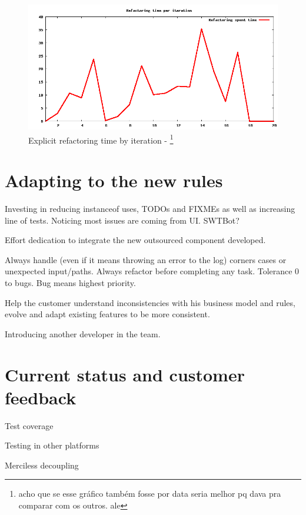 \documentclass[lnbip]{svmultln}
\begin{document}
\begin{figure}[hbt]
  \centerline{
    \includegraphics[width=120mm]{refactoring.png}
  }
  \caption{Explicit refactoring time by iteration - \footnote{acho que se esse gráfico também fosse por data seria melhor pq dava pra comparar com os outros. ale}}
  \label{fig:refactoring}
\end{figure}

\section{Adapting to the new rules}
\label{sec:adapting}

Investing in reducing instanceof uses, TODOs and FIXMEs as well as
increasing line of tests. Noticing most issues are coming from
UI. SWTBot?

Effort dedication to integrate the new outsourced component developed.

Always handle (even if it means throwing an error to the log) corners
cases or unexpected input/paths. Always refactor before completing any
task. Tolerance 0 to bugs. Bug means highest priority.

Help the customer understand inconsistencies with his business model and rules,
evolve and adapt existing features to be more consistent.

Introducing another developer in the team.

\section{Current status and customer feedback}
\label{sec:nowadays}

Test coverage

Testing in other platforms

Merciless decoupling
\end{document}
